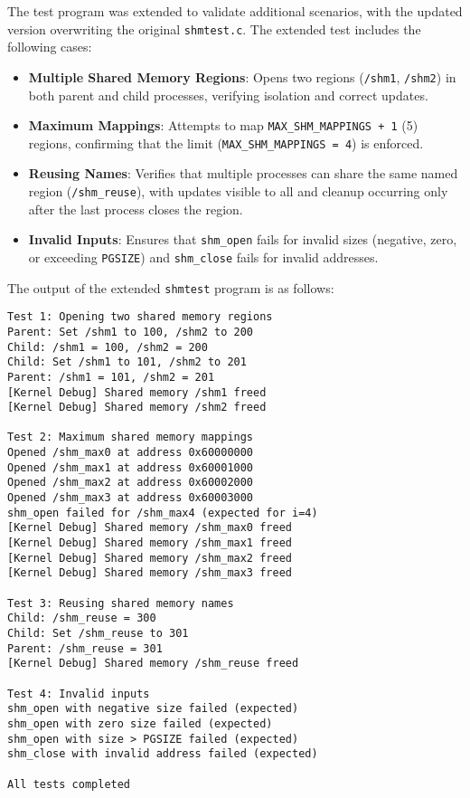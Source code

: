 \documentclass[12pt]{article}
\begin{document}
The test program was extended to validate additional scenarios, with the updated version overwriting the original \texttt{shmtest.c}. The extended test includes the following cases:
\begin{itemize}
  \item \textbf{Multiple Shared Memory Regions}: Opens two regions (\texttt{/shm1}, \texttt{/shm2}) in both parent and child processes, verifying isolation and correct updates.
  \item \textbf{Maximum Mappings}: Attempts to map \texttt{MAX\_SHM\_MAPPINGS + 1} (5) regions, confirming that the limit (\texttt{MAX\_SHM\_MAPPINGS = 4}) is enforced.
  \item \textbf{Reusing Names}: Verifies that multiple processes can share the same named region (\texttt{/shm\_reuse}), with updates visible to all and cleanup occurring only after the last process closes the region.
  \item \textbf{Invalid Inputs}: Ensures that \texttt{shm\_open} fails for invalid sizes (negative, zero, or exceeding \texttt{PGSIZE}) and \texttt{shm\_close} fails for invalid addresses.
\end{itemize}

The output of the extended \texttt{shmtest} program is as follows:
\begin{lstlisting}
Test 1: Opening two shared memory regions
Parent: Set /shm1 to 100, /shm2 to 200
Child: /shm1 = 100, /shm2 = 200
Child: Set /shm1 to 101, /shm2 to 201
Parent: /shm1 = 101, /shm2 = 201
[Kernel Debug] Shared memory /shm1 freed
[Kernel Debug] Shared memory /shm2 freed

Test 2: Maximum shared memory mappings
Opened /shm_max0 at address 0x60000000
Opened /shm_max1 at address 0x60001000
Opened /shm_max2 at address 0x60002000
Opened /shm_max3 at address 0x60003000
shm_open failed for /shm_max4 (expected for i=4)
[Kernel Debug] Shared memory /shm_max0 freed
[Kernel Debug] Shared memory /shm_max1 freed
[Kernel Debug] Shared memory /shm_max2 freed
[Kernel Debug] Shared memory /shm_max3 freed

Test 3: Reusing shared memory names
Child: /shm_reuse = 300
Child: Set /shm_reuse to 301
Parent: /shm_reuse = 301
[Kernel Debug] Shared memory /shm_reuse freed

Test 4: Invalid inputs
shm_open with negative size failed (expected)
shm_open with zero size failed (expected)
shm_open with size > PGSIZE failed (expected)
shm_close with invalid address failed (expected)

All tests completed
\end{lstlisting}
\end{document}
